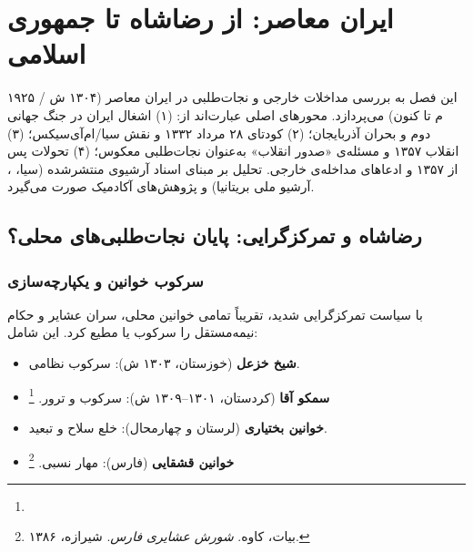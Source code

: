 \chapter{ایران معاصر: از رضاشاه تا جمهوری اسلامی}
\label{ch:modern-iran}

\begin{tcolorbox}[mybox, title={چکیده‌ی فصل}]
این فصل به بررسی مداخلات خارجی و نجات‌طلبی در ایران معاصر (۱۳۰۴ ش / ۱۹۲۵ م تا کنون) می‌پردازد. محورهای اصلی عبارت‌اند از: (۱) اشغال ایران در جنگ جهانی دوم و بحران آذربایجان؛ (۲) کودتای ۲۸ مرداد ۱۳۳۲ و نقش سیا/ام‌آی‌سیکس؛ (۳) انقلاب ۱۳۵۷ و مسئله‌ی «صدور انقلاب» به‌عنوان نجات‌طلبی معکوس؛ (۴) تحولات پس از ۱۳۵۷ و ادعاهای مداخله‌ی خارجی. تحلیل بر مبنای اسناد آرشیوی منتشرشده (سیا، ، آرشیو ملی بریتانیا) و پژوهش‌های آکادمیک صورت می‌گیرد.
\end{tcolorbox}

\section{رضاشاه و تمرکزگرایی: پایان نجات‌طلبی‌های محلی؟}
\label{sec:ch07-reza-shah}

\subsection{سرکوب خوانین و یکپارچه‌سازی}
\label{subsec:ch07-centralization}

 با سیاست تمرکزگرایی شدید، تقریباً تمامی خوانین محلی، سران عشایر و حکام نیمه‌مستقل را سرکوب یا مطیع کرد. این شامل:
\begin{itemize}[nosep, rightmargin=1em]
  \item \textbf{شیخ خزعل} (خوزستان، ۱۳۰۳ ش): سرکوب نظامی.
  \item \textbf{سمکو آقا} (کردستان، ۱۳۰۱–۱۳۰۹ ش): سرکوب و ترور.%
  \footnote{}
  \item \textbf{خوانین بختیاری} (لرستان و چهارمحال): خلع سلاح و تبعید.
  \item \textbf{خوانین قشقایی} (فارس): مهار نسبی.%
  \footnote{بیات، کاوه. \textit{شورش عشایری فارس}. شیرازه، ۱۳۸۶.}
\end{itemize}

